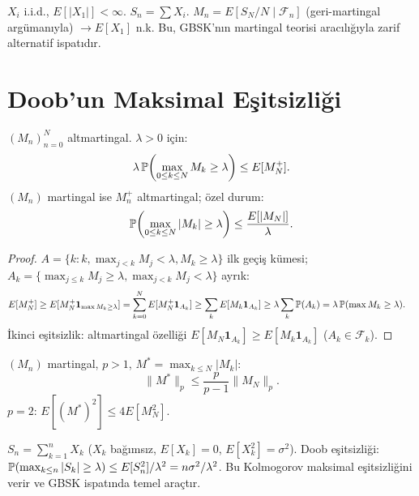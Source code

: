 \begin{onerme}
$X_i$ i.i.d., $E[|X_1|] < \infty$. $S_n = \sum X_i$.
$M_n = E[S_N/N \mid \mathcal{F}_n]$ (geri-martingal argümanıyla) $\to E[X_1]$ n.k.
Bu, GBSK'nın martingal teorisi aracılığıyla zarif alternatif ispatıdır.
\end{onerme}

\section{Doob'un Maksimal Eşitsizliği}
\label{sec:doob_maksimal}

\begin{teorem}
\label{thm:doob_maksimal}
$(M_n)_{n=0}^N$ altmartingal. $\lambda>0$ için:
\[
  \lambda\,\mathbb{P}\!\left(\max_{0\leq k\leq N}M_k \geq \lambda\right)
  \leq E[M_N^+].
\]
$(M_n)$ martingal ise $M_n^+$ altmartingal; özel durum:
\[
  \mathbb{P}\!\left(\max_{0\leq k\leq N}|M_k| \geq \lambda\right)
  \leq \frac{E[|M_N|]}{\lambda}.
\]
\end{teorem}

\begin{proof}
$A = \{k: k, \max_{j<k}M_j<\lambda, M_k\geq\lambda\}$ ilk geçiş kümesi; $A_k = \{\max_{j\leq k}M_j\geq\lambda, \max_{j<k}M_j<\lambda\}$ ayrık:
\begin{align*}
  E[M_N^+] &\geq E[M_N^+ \mathbf{1}_{\max M_k\geq\lambda}]
  = \sum_{k=0}^N E[M_N^+\mathbf{1}_{A_k}]
  \geq \sum_k E[M_k\mathbf{1}_{A_k}]
  \geq \lambda\sum_k\mathbb{P}(A_k) = \lambda\,\mathbb{P}(\max M_k\geq\lambda).
\end{align*}
İkinci eşitsizlik: altmartingal özelliği $E[M_N\mathbf{1}_{A_k}]\geq E[M_k\mathbf{1}_{A_k}]$ ($A_k\in\mathcal{F}_k$).
\end{proof}

\begin{sonuc}
$(M_n)$ martingal, $p>1$, $M^* = \max_{k\leq N}|M_k|$:
\[
  \|M^*\|_p \leq \frac{p}{p-1}\|M_N\|_p.
\]
$p=2$: $E[(M^*)^2] \leq 4E[M_N^2]$.
\end{sonuc}

\begin{ornek}
$S_n = \sum_{k=1}^n X_k$ ($X_k$ bağımsız, $E[X_k]=0$, $E[X_k^2]=\sigma^2$). Doob eşitsizliği:
$\mathbb{P}(\max_{k\leq n}|S_k|\geq\lambda)\leq E[S_n^2]/\lambda^2 = n\sigma^2/\lambda^2$.
Bu Kolmogorov maksimal eşitsizliğini verir ve GBSK ispatında temel araçtır.
\end{ornek}

